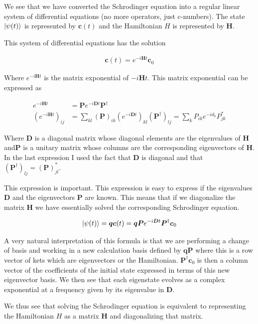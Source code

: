 \documentclass[12pt]{article}
\newcommand{\bv}[1]{\boldsymbol{#1}}
\begin{document}
We see that we have converted the Schrodinger equation into a regular linear system of differential equations (no more operators, just c-numbers). The state $\ket{\psi(t)}$ is represented by $\bv{c}(t)$ and the Hamiltonian $H$ is represented by $\bv{H}$.

This system of differential equations has the solution

\begin{align}
\bv{c}(t) = e^{-i\bv{H} t}\bv{c}_0 
\end{align}

Where $e^{-i\bv{H}t}$ is the matrix exponential of $-i\bv{H}t$. This matrix exponential can be expressed as

\begin{align}
e^{-i\bv{H}t} &= \bv{P}e^{-i\bv{D}t}\bv{P}^{\dag}\\
\left(e^{-i\bv{H}t}\right)_{ij} &= \sum_{kl} \left(\bv{P}\right)_{ik}\left(e^{-i\bv{D}t}\right)_{kl}\left(\bv{P}^{\dag}\right)_{lj} = \sum_k P_{ik} e^{-id_k} P^*_{jk}
\end{align}

Where $\bv{D}$ is a diagonal matrix whose diagonal elements are the eigenvalues of $\bv{H}$ and$\bv{P}$ is a unitary matrix whose columns are the corresponding eigenvectors of $\bv{H}$. In the last expression I used the fact that $\bv{D}$ is diagonal and that $\left(\bv{P}^{\dag} \right)_{lj} = \left(\bv{P}\right)^*_{jl}$.

This expression is important. This expression is easy to express if the eigenvalues $\bv{D}$ and the eigenvectors $\bv{P}$ are known. This means that if we diagonalize the matrix $\bv{H}$ we have essentially solved the corresponding Schrodinger equation.

\begin{align}
\ket{\psi(t)} = \bv{q}\bv{c}(t) = \bv{q}  \bv{P}e^{-i\bv{D}t}\bv{P}^{\dag}\bv{c}_0
\end{align}

A very natural interpretation of this formula is that we are performing a change of basis and working in a new calculation basis defined by $\bv{q}\bv{P}$ where this is a row vector of kets which are eigenvectors or the Hamiltonian. $\bv{P}^{\dag}\bv{c}_0$ is then a column vector of the coefficients of the initial state expressed in terms of this new eigenvector basis. We then see that each eigenstate evolves as a complex exponential at a frequency given by its eigenvalue in $\bv{D}$.

We thus see that solving the Schrodinger equation is equivalent to representing the Hamiltonian $H$ as a matrix $\bv{H}$ and diagonalizing that matrix.
\end{document}

